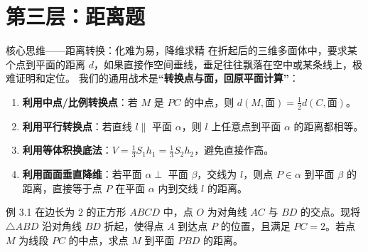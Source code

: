 \documentclass[11pt,a4paper]{ctexart}
\begin{document}
\newpage

\section{第三层：距离题}

\begin{keybox}{核心思维——距离转换：化难为易，降维求精}
在折起后的三维多面体中，要求某个点到平面的距离 $d$，如果直接作空间垂线，垂足往往飘落在空中或某条线上，极难证明和定位。
我们的通用战术是\textbf{“转换点与面，回原平面计算”}：
\begin{enumerate}[label=\arabic*. , leftmargin=2em, itemsep=0.1em]
  \item \textbf{利用中点/比例转换点}：若 $M$ 是 $PC$ 的中点，则 $d(M, \text{面}) = \frac{1}{2} d(C, \text{面})$。
  \item \textbf{利用平行转换点}：若直线 $l \parallel$ 平面 $\alpha$，则 $l$ 上任意点到平面 $\alpha$ 的距离都相等。
  \item \textbf{利用等体积换底法}：$V = \frac{1}{3} S_1 h_1 = \frac{1}{3} S_2 h_2$，避免直接作高。
  \item \textbf{利用面面垂直降维}：若平面 $\alpha \perp$ 平面 $\beta$，交线为 $l$，则点 $P \in \alpha$ 到平面 $\beta$ 的距离，直接等于点 $P$ 在平面 $\alpha$ 内到交线 $l$ 的距离。
\end{enumerate}
\end{keybox}

\begin{exbox}{例 3.1}
在边长为 $2$ 的正方形 $ABCD$ 中，点 $O$ 为对角线 $AC$ 与 $BD$ 的交点。现将 $\triangle ABD$ 沿对角线 $BD$ 折起，使得点 $A$ 到达点 $P$ 的位置，且满足 $PC = 2$。若点 $M$ 为线段 $PC$ 的中点，求点 $M$ 到平面 $PBD$ 的距离。
\end{exbox}
\end{document}
